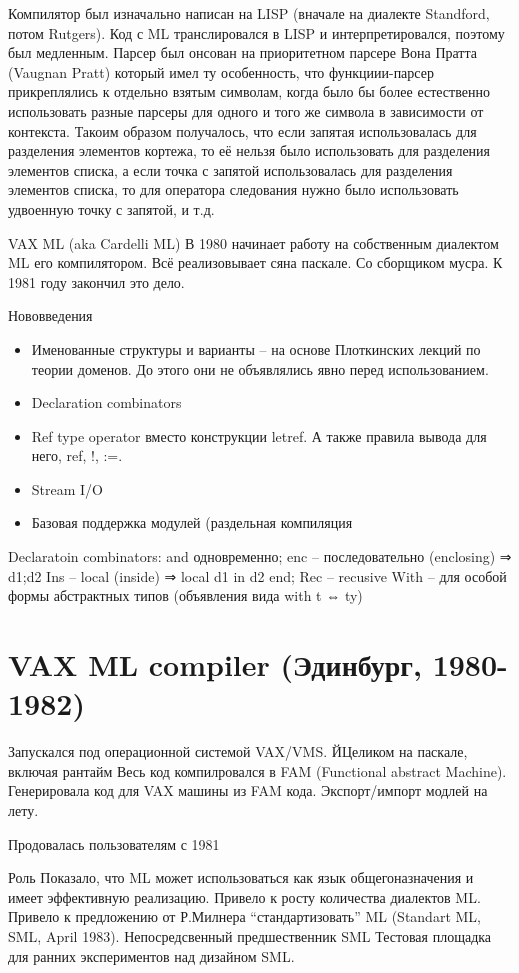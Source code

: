 \documentclass[14pt]{matmex-diploma-custom}
\begin{document}
 Компилятор был изначально написан на LISP (вначале на диалекте Standford, потом Rutgers). Код с ML транслировался в LISP и интерпретировался, поэтому был медленным. Парсер был онсован на приоритетном парсере Вона Пратта (Vaugnan Pratt) который имел ту особенность, что функциии-парсер прикреплялись к отдельно взятым символам, когда было бы более естественно использовать разные парсеры для одного и того же символа в зависимости от контекста. Такоим образом получалось, что если запятая использовалась для разделения элементов кортежа, то её нельзя было использовать для разделения элементов списка, а если точка с запятой использовалась для разделения элементов списка, то для оператора следования нужно было использовать удвоенную точку с запятой, и т.д.

VAX ML (aka Cardelli ML)
В 1980 начинает работу на собственным диалектом ML его компилятором. Всё реализовывает сяна паскале. Со сборщиком мусра. К 1981 году закончил это дело.

Нововведения
\begin{itemize}
 \item Именованные структуры и варианты -- на основе Плоткинских лекций по теории доменов.  До этого они не объявлялись явно перед использованием.
\item Declaration combinators
\item Ref type operator вместо конструкции letref. А также правила вывода для него, ref, !, :=.
\item Stream I/O
\item Базовая поддержка модулей (раздельная компиляция

\end{itemize}


Declaratoin combinators:
and одновременно;
enc -- последовательно (enclosing)  ⇒ d1;d2
Ins -- local (inside) ⇒ local d1 in d2 end;
Rec -- recusive
With -- для особой формы абстрактных типов (объявления вида with t ⇔ ty)

\chapter{VAX ML compiler (Эдинбург, 1980-1982)}
Запускался под операционной системой VAX/VMS.
ЙЦеликом на паскале, включая рантайм
Весь код компилровался в FAM (Functional abstract Machine).
Генерировала код для VAX машины из FAM кода.
Экспорт/импорт модлей на лету.

Продовалась пользователям с 1981

Роль
Показало, что ML может использоваться как язык общегоназначения и имеет эффективную реализацию. 
Привело к росту количества диалектов ML. Привело к предложению от Р.Милнера “стандартизовать” ML (Standart ML, SML, April 1983).
Непосредсвенный предшественник SML
Тестовая площадка для ранних экспериментов над дизайном SML.
\end{document}
